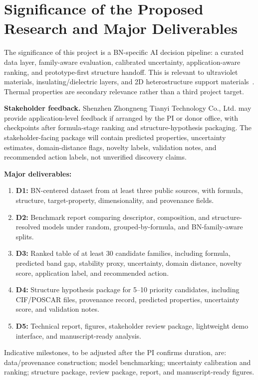 \documentclass[10pt,a4paper]{article}
\begin{document}
\section{Significance of the Proposed Research and Major Deliverables}
The significance of this project is a BN-specific AI decision pipeline: a curated data layer, family-aware evaluation, calibrated uncertainty, application-aware ranking, and prototype-first structure handoff. This is relevant to ultraviolet materials, insulating/dielectric layers, and 2D heterostructure support materials~\cite{watanabe2004_hbn_uv,cassabois2016_hbn_indirect,dean2010_hbn_graphene}. Thermal properties are secondary relevance rather than a third project target.

\textbf{Stakeholder feedback.}
Shenzhen Zhongneng Tianyi Technology Co., Ltd. may provide application-level feedback if arranged by the PI or donor office, with checkpoints after formula-stage ranking and structure-hypothesis packaging. The stakeholder-facing package will contain predicted properties, uncertainty estimates, domain-distance flags, novelty labels, validation notes, and recommended action labels, not unverified discovery claims.

\textbf{Major deliverables:}
\begin{enumerate}
  \item \textbf{D1:} BN-centered dataset from at least three public sources, with formula, structure, target-property, dimensionality, and provenance fields.
  \item \textbf{D2:} Benchmark report comparing descriptor, composition, and structure-resolved models under random, grouped-by-formula, and BN-family-aware splits.
  \item \textbf{D3:} Ranked table of at least 30 candidate families, including formula, predicted band gap, stability proxy, uncertainty, domain distance, novelty score, application label, and recommended action.
  \item \textbf{D4:} Structure hypothesis package for 5--10 priority candidates, including CIF/POSCAR files, provenance record, predicted properties, uncertainty score, and validation notes.
  \item \textbf{D5:} Technical report, figures, stakeholder review package, lightweight demo interface, and manuscript-ready analysis.
\end{enumerate}
Indicative milestones, to be adjusted after the PI confirms duration, are: data/provenance construction; model benchmarking; uncertainty calibration and ranking; structure package, review package, report, and manuscript-ready figures.
\end{document}
